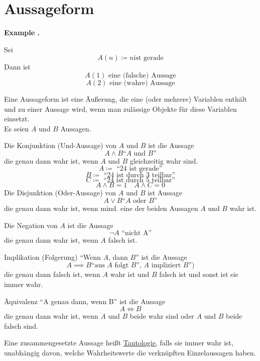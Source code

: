 \documentclass[a4paper]{article}
\newenvironment{Example}{
	\begin{ExampleBox}
		{\textbf{Example \thesection.\examplenumber}}
		\setlength\parindent{1em}
	}{
		\xdef\examplenumber{\number\numexpr\examplenumber+1\relax}
	\end{ExampleBox}
}
\begin{document}
\section{Aussageform}
\begin{Example}
	Sei
	\[ A(n) \coloneqq n \text{ist gerade}\]
	Dann ist
	\[ A(1) \text{ eine (falsche) Aussage}\]
	\[ A(2) \text{ eine (wahre) Aussage}\]
\end{Example}
Eine Aussageform ist eine Äußerung, die eine (oder mehrere) Variablen enthält und zu einer Aussage wird, wenn man zulässige Objekte für diese Variablen einsetzt.\\
Es seien $A$ und $B$ Aussagen.\par
Die Konjunktion (Und-Aussage) von $A$ und $B$ ist die Aussage
\[ A \land B \text{``$A$ und $B$''}\]
die genau dann wahr ist, wenn $A$ und $B$ gleichzeitig wahr sind.
\[ A \coloneqq \text{ ``$24$ ist gerade''}\]
\[ B \coloneqq \text{ ``$24$ ist durch $3$ teilbar''}\]
\[ C \coloneqq \text{ ``$24$ ist durch $5$ teilbar''}\]
\[ A \land B = 1\quad A \land C = 0\]
Die Disjunktion (Oder-Aussage) von $A$ und $B$ ist Aussage
\[A \lor B \text{``$A$ oder $B$''}\]
die genau dann wahr ist, wenn mind. eine der beiden Aussagen $A$ und $B$ wahr ist.\par
Die Negation von $A$ ist die Aussage
\[ \neg A \text{ ``nicht A''}\]
die genau dann wahr ist, wenn $A$ falsch ist.\par
Implikation (Folgerung) ``Wenn $A$, dann $B$'' ist die Aussage
\[ A \implies B \text{``aus $A$ folgt $B$'', $A$ impliziert $B$'')}\]
die genau dann falsch ist, wenn $A$ wahr ist und $B$ falsch ist und sonst ist sie immer wahr.\par
Äquivalenz ``A genau dann, wenn B'' ist die Aussage
\[ A \iff B \]
die genau dann wahr ist, wenn $A$ und $B$ beide wahr sind oder $A$ und $B$ beide falsch sind.\par
Eine zusammengesetzte Aussage heißt \underline{Tautologie,} falls sie immer wahr ist, unabhängig davon, welche Wahrheitswerte die verknüpften Einzelaussagen haben.\\
\end{document}
